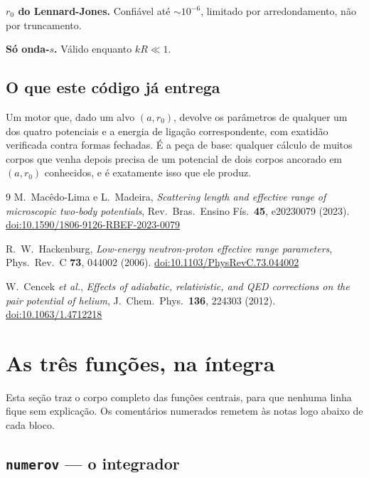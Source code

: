 \documentclass[11pt,a4paper]{article}
\begin{document}
\textbf{$r_0$ do Lennard-Jones.} Confiável até $\sim10^{-6}$, limitado por
arredondamento, não por truncamento.

\textbf{Só onda-$s$.} Válido enquanto $kR \ll 1$.

\subsection*{O que este código já entrega}

Um motor que, dado um alvo $(a, r_0)$, devolve os parâmetros de qualquer um dos
quatro potenciais e a energia de ligação correspondente, com exatidão verificada
contra formas fechadas. É a peça de base: qualquer cálculo de muitos corpos que
venha depois precisa de um potencial de dois corpos ancorado em $(a, r_0)$
conhecidos, e é exatamente isso que ele produz.

\begin{thebibliography}{9}
  M.~Macêdo-Lima e L.~Madeira,
  \emph{Scattering length and effective range of microscopic two-body potentials},
  Rev.\ Bras.\ Ensino Fís.\ \textbf{45}, e20230079 (2023).
  \href{https://doi.org/10.1590/1806-9126-RBEF-2023-0079}{doi:10.1590/1806-9126-RBEF-2023-0079}

  R.~W.~Hackenburg,
  \emph{Low-energy neutron-proton effective range parameters},
  Phys.\ Rev.\ C \textbf{73}, 044002 (2006).
  \href{https://doi.org/10.1103/PhysRevC.73.044002}{doi:10.1103/PhysRevC.73.044002}

  W.~Cencek \emph{et al.},
  \emph{Effects of adiabatic, relativistic, and QED corrections on the pair
  potential of helium},
  J.\ Chem.\ Phys.\ \textbf{136}, 224303 (2012).
  \href{https://doi.org/10.1063/1.4712218}{doi:10.1063/1.4712218}
\end{thebibliography}


\appendix
\section{As três funções, na íntegra}

Esta seção traz o corpo completo das funções centrais, para que nenhuma linha
fique sem explicação. Os comentários numerados remetem às notas logo abaixo de
cada bloco.

\subsection{\texttt{numerov} --- o integrador}
\end{document}
